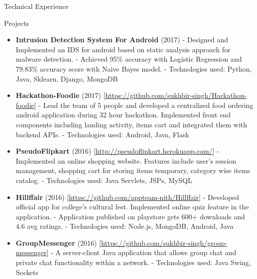 \documentclass[]{mcdowellcv}
\begin{document}
	\begin{cvsection}{Technical Experience}
		\begin{cvsubsection}{Projects}{}{}
			\begin{itemize}
				\item \textbf{Intrusion Detection System For Android} (2017) 
				\newline- Designed and Implemented an IDS for android based on static analysis approach for malware detection.
				\newline- Achieved 95\% accuracy with Logistic Regression and 79.83\% accuracy score with Naive Bayes model.
				\newline- Technologies used: Python, Java, Sklearn, Django, MongoDB
				\newline
				\item \textbf{Hackathon-Foodie} (2017) \textcolor[rgb]{.2,.2,.2}{[\href {https://github.com/sukhbir-singh/Hackathon-foodie}{https://github.com/sukhbir-singh/Hackathon-foodie}]}
				\newline- Lead the team of 5 people and developed a centralized food ordering android application during 32 hour hackathon. Implemented front end components including landing activity, items cart and integrated them with backend APIs. 
				\newline- Technologies used: Android, Java, Flask
				\newline
				\item \textbf{PseudoFlipkart} (2016) \textcolor[rgb]{.2,.2,.2}{[\href {http://pseudoflipkart.herokuapp.com/}{http://pseudoflipkart.herokuapp.com/}]}
				\newline- Implemented an online shopping website. Features include user's session management, shopping cart for storing items temporary, category wise items catalog. 
				\newline- Technologies used: Java Servlets, JSPs, MySQL
				\newline
				\item \textbf{Hillffair} (2016) \textcolor[rgb]{.2,.2,.2}{[\href {https://github.com/appteam-nith/Hillffair}{https://github.com/appteam-nith/Hillffair}]}
				\newline- Developed official app for college’s cultural fest. Implemented online quiz feature in the application. 
				\newline- Application published on playstore gets 600+ downloads and 4.6 avg ratings.
				\newline- Technologies used: Node.js, MongoDB, Android, Java
				\newline
				\item \textbf{GroupMessenger} (2016) \textcolor[rgb]{.2,.2,.2}{[\href {https://github.com/sukhbir-singh/group-messenger}{https://github.com/sukhbir-singh/group-messenger}]}
				\newline- A server-client Java application that allows group chat and private chat functionality within a network. 
				\newline- Technologies used: Java Swing, Sockets
			\end{itemize}
		\end{cvsubsection}
	\end{cvsection}
\end{document}
